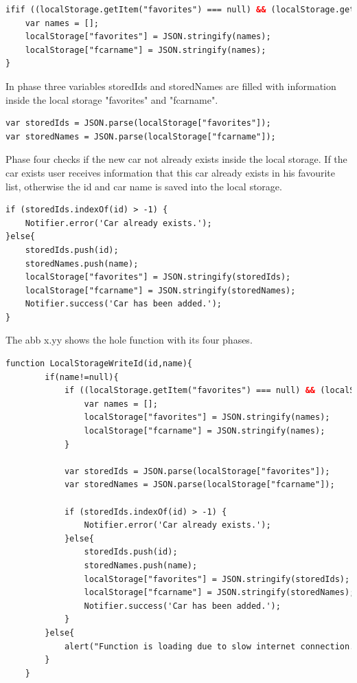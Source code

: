 \begin{lstlisting}[language=html, caption= 
start timer function,captionpos=b]
ifif ((localStorage.getItem("favorites") === null) && (localStorage.getItem("fcarname") == null)) {
	var names = [];
	localStorage["favorites"] = JSON.stringify(names);
	localStorage["fcarname"] = JSON.stringify(names);
}
\end{lstlisting}

In phase three variables storedIds and storedNames are filled with information inside the local storage "favorites" and "fcarname".
\\

\begin{lstlisting}[language=html, caption= 
start timer function,captionpos=b]
var storedIds = JSON.parse(localStorage["favorites"]);
var storedNames = JSON.parse(localStorage["fcarname"]);
\end{lstlisting}

Phase four checks if the new car not already exists inside the local storage. If the car exists user receives information that this car already exists in his favourite list, otherwise the id and car name is saved into the local storage.
\\

\begin{lstlisting}[language=html, caption= 
start timer function,captionpos=b]
if (storedIds.indexOf(id) > -1) {
	Notifier.error('Car already exists.');
}else{
	storedIds.push(id);
	storedNames.push(name);
	localStorage["favorites"] = JSON.stringify(storedIds);
	localStorage["fcarname"] = JSON.stringify(storedNames);
	Notifier.success('Car has been added.');
}
\end{lstlisting}

The abb x.yy shows the hole function with its four phases.
\begin{lstlisting}[language=html, caption= 
start timer function,captionpos=b]
function LocalStorageWriteId(id,name){
		if(name!=null){
			if ((localStorage.getItem("favorites") === null) && (localStorage.getItem("fcarname") == null)) {
				var names = [];
				localStorage["favorites"] = JSON.stringify(names);
				localStorage["fcarname"] = JSON.stringify(names);
			}
			
			var storedIds = JSON.parse(localStorage["favorites"]);
			var storedNames = JSON.parse(localStorage["fcarname"]);
		
			if (storedIds.indexOf(id) > -1) {
				Notifier.error('Car already exists.');
			}else{
				storedIds.push(id);
				storedNames.push(name);
				localStorage["favorites"] = JSON.stringify(storedIds);
				localStorage["fcarname"] = JSON.stringify(storedNames);
				Notifier.success('Car has been added.');
			}
		}else{
			alert("Function is loading due to slow internet connection.");
		}
    }
\end{lstlisting}

